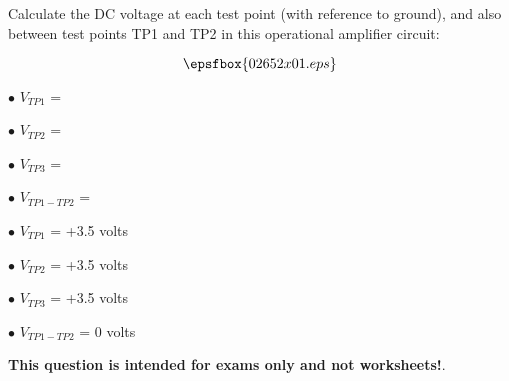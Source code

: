 

Calculate the DC voltage at each test point (with reference to ground), and also between test points TP1 and TP2 in this operational amplifier circuit:

$$\epsfbox{02652x01.eps}$$

\medskip
\item{$\bullet$} $V_{TP1}$ =
\item{$\bullet$} $V_{TP2}$ =
\item{$\bullet$} $V_{TP3}$ =
\item{$\bullet$} $V_{TP1-TP2}$ =
\medskip







\medskip
\goodbreak
\item{$\bullet$} $V_{TP1}$ = +3.5 volts
\item{$\bullet$} $V_{TP2}$ = +3.5 volts
\item{$\bullet$} $V_{TP3}$ = +3.5 volts
\item{$\bullet$} $V_{TP1-TP2}$ = 0 volts
\medskip







{\bf This question is intended for exams only and not worksheets!}.




